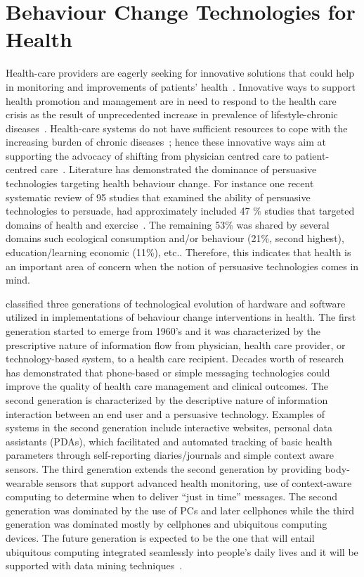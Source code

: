 \section{Behaviour Change Technologies for Health}
Health-care providers are eagerly seeking for innovative solutions that could help in monitoring and improvements of patients' health~\citep{higgins2016smartphone}. Innovative ways to support health promotion and management are in need to respond to the health care crisis as the result of unprecedented increase in prevalence of lifestyle-chronic diseases~\citep{arsand:mobile}. Health-care systems do not have sufficient resources to cope with the increasing burden of chronic diseases~\citep{quinn2008welldoc,arsand:mobile}; hence these innovative ways aim at supporting the advocacy of shifting from physician centred care to patient-centred care~\citep{higgins2016smartphone,korhonen2010personal}.  Literature has demonstrated the dominance of persuasive technologies targeting health behaviour change. For instance one recent systematic review of 95 studies that examined the ability of persuasive technologies to persuade, had approximately included 47 \% studies that  targeted domains of health and exercise~\citep{hamari2014persuasive}. The remaining 53\% was shared by several domains such ecological consumption and/or behaviour (21\%, second highest), education/learning economic (11\%), etc.. Therefore, this indicates that health is an important area of concern when the notion of persuasive technologies comes in mind.

\cite{chatterjee2009healthy} classified three generations  of technological evolution of hardware and software utilized in implementations of behaviour change interventions in health. The first generation started to emerge from 1960's and it was characterized by the prescriptive nature of information flow from physician, health care provider, or technology-based system, to a health care recipient. Decades worth of research has demonstrated that phone-based or simple messaging technologies could improve the quality of health care management and clinical outcomes. The second generation is characterized by the descriptive nature of information interaction between an end user and a persuasive technology. Examples of systems in the second generation include interactive websites, personal data assistants (PDAs), which facilitated and automated tracking of basic health parameters through self-reporting diaries/journals and simple context aware sensors. The third generation extends the second generation by providing body-wearable sensors that support advanced health monitoring, use of context-aware computing to determine when to deliver “just in time” messages.  The second generation was dominated by the use of PCs and later cellphones while the third generation was dominated mostly by cellphones and ubiquitous computing devices. The future generation is expected to be the one that will entail ubiquitous computing integrated seamlessly into people's daily lives and it will be supported with data mining techniques~\citep{chatterjee2009healthy}.


